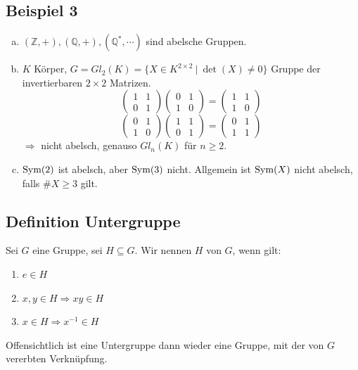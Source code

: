 \subsection{Beispiel 3}
\label{sub: beispiel_3}
\begin{enumerate}[(a)]
	\item $(\mathds{Z}, +), (\mathds{Q}, +), (\mathds{Q}^*,\cdots)$ sind abelsche Gruppen.
	\item $K$ Körper, $G=Gl_2(K)=\{X \in K^{2\times 2}~ |~ \det(X)\not= 0 \}$ Gruppe der invertierbaren $2 \times 2$ Matrizen.\\
\[
	\begin{pmatrix}	1 & 1\\ 0 & 1 \end{pmatrix}
	\begin{pmatrix} 0 & 1\\	1 & 0 \end{pmatrix}
	=
	\begin{pmatrix}	1 & 1\\	1 & 0 \end{pmatrix}
\]
\[
	\begin{pmatrix} 0 & 1\\	1 & 0 \end{pmatrix}
	\begin{pmatrix} 1 & 1\\ 0 & 1 \end{pmatrix}
	=
	\begin{pmatrix} 0 & 1\\ 1 & 1 \end{pmatrix}
\]
	$\Rightarrow$ nicht abelsch, genauso $Gl_n(K)$ für $n\ge 2$.
	\item $\operatorname{Sym}(2)$ ist abelsch, aber $\operatorname{Sym}(3)$ nicht. Allgemein ist $\operatorname{Sym}(X)$ nicht abelsch, falls $\#X \ge 3$ gilt.
\end{enumerate}

\subsection{Definition Untergruppe}
\label{sub: def_untergruppe}
Sei $G$ eine Gruppe, sei $H\subseteq G$. Wir nennen $H$   von $G$, wenn gilt:
\begin{enumerate}[(UG1)]
	\item $e\in H$
	\item $x,y\in H \Rightarrow xy\in H$
	\item $x\in H \Rightarrow x^{-1} \in H$
\end{enumerate}
Offensichtlich ist eine Untergruppe dann wieder eine Gruppe, mit der von $G$ vererbten Verknüpfung.

